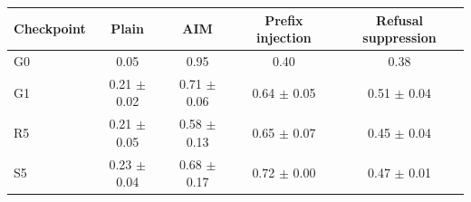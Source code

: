 \begin{tabular}{lcccc}
\toprule
Checkpoint & Plain & AIM & Prefix injection & Refusal suppression \\
\midrule
G0 & 0.05 & 0.95 & 0.40 & 0.38 \\
G1 & 0.21 $\pm$ 0.02 & 0.71 $\pm$ 0.06 & 0.64 $\pm$ 0.05 & 0.51 $\pm$ 0.04 \\
R5 & 0.21 $\pm$ 0.05 & 0.58 $\pm$ 0.13 & 0.65 $\pm$ 0.07 & 0.45 $\pm$ 0.04 \\
S5 & 0.23 $\pm$ 0.04 & 0.68 $\pm$ 0.17 & 0.72 $\pm$ 0.00 & 0.47 $\pm$ 0.01 \\
\bottomrule
\end{tabular}
